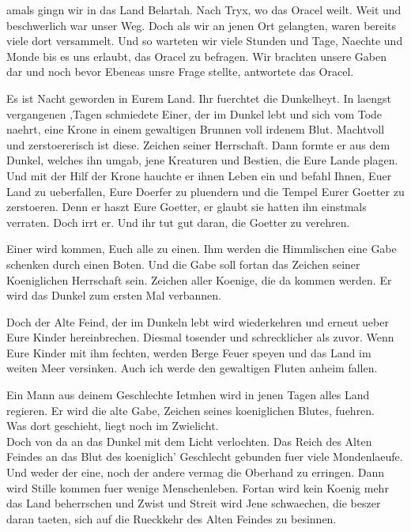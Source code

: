 \documentclass[a5paper,8pt]{book}
\begin{document}
amals gingn wir in das Land Belartah. Nach Tryx, wo das Oracel weilt. Weit und beschwerlich war unser Weg. Doch als wir an jenen Ort gelangten, waren bereits viele dort versammelt. Und so warteten wir viele Stunden und Tage, Naechte und Monde bis es uns erlaubt, das Oracel zu befragen. Wir brachten unsere Gaben dar und noch bevor Ebeneas unsre Frage stellte, antwortete das Oracel.

Es ist Nacht geworden in Eurem Land. Ihr fuerchtet die Dunkelheyt.
In laengst vergangenen ‚Tagen schmiedete Einer, der im Dunkel lebt und sich vom Tode naehrt, eine Krone in einem gewaltigen Brunnen voll irdenem Blut. Machtvoll und zerstoererisch ist diese. Zeichen seiner Herrschaft. Dann formte er aus dem Dunkel, welches ihn umgab, jene Kreaturen und Bestien, die Eure Lande plagen. Und mit der Hilf der Krone hauchte er ihnen Leben ein und befahl Ihnen, Euer Land zu ueberfallen, Eure Doerfer zu pluendern und die Tempel Eurer Goetter zu zerstoeren. Denn er haszt Eure Goetter, er glaubt sie hatten ihn einstmals verraten. Doch irrt er. Und ihr tut gut daran, die Goetter zu verehren.

Einer wird kommen, Euch alle zu einen. Ihm werden die Himmlischen eine Gabe schenken durch einen Boten. Und die Gabe soll fortan das Zeichen seiner Koeniglichen Herrschaft sein. Zeichen aller Koenige, die da kommen werden. Er wird das Dunkel zum ersten Mal verbannen.

Doch der Alte Feind, der im Dunkeln lebt wird wiederkehren und erneut ueber Eure Kinder hereinbrechen. Diesmal tosender und schrecklicher als zuvor. Wenn Eure Kinder mit ihm fechten, werden Berge Feuer speyen und das Land im weiten Meer versinken. Auch ich werde den gewaltigen Fluten anheim fallen.

Ein Mann aus deinem Geschlechte Ietmhen wird in jenen Tagen alles Land regieren. Er wird die alte Gabe, Zeichen seines koeniglichen Blutes, fuehren.\\

Was dort geschieht, liegt noch im Zwielicht.\\

Doch von da an das Dunkel mit dem Licht verlochten. Das Reich des Alten Feindes an das Blut des koeniglich’ Geschlecht gebunden fuer viele Mondenlaeufe. Und weder der eine, noch der andere vermag die Oberhand zu erringen. Dann wird Stille kommen fuer wenige Menschenleben. Fortan wird kein Koenig mehr das Land beherrschen und Zwist und Streit wird Jene schwaechen, die beszer daran taeten, sich auf die Rueckkehr des Alten Feindes zu besinnen. 
\end{document}
